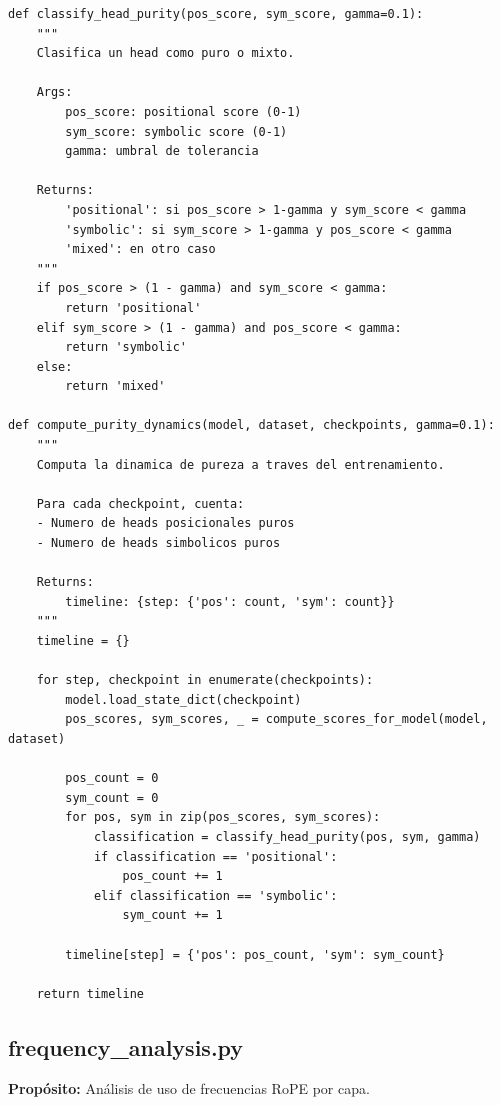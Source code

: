 \documentclass[12pt,a4paper]{report}
\begin{document}
\begin{lstlisting}
def classify_head_purity(pos_score, sym_score, gamma=0.1):
    """
    Clasifica un head como puro o mixto.
    
    Args:
        pos_score: positional score (0-1)
        sym_score: symbolic score (0-1)
        gamma: umbral de tolerancia
    
    Returns:
        'positional': si pos_score > 1-gamma y sym_score < gamma
        'symbolic': si sym_score > 1-gamma y pos_score < gamma
        'mixed': en otro caso
    """
    if pos_score > (1 - gamma) and sym_score < gamma:
        return 'positional'
    elif sym_score > (1 - gamma) and pos_score < gamma:
        return 'symbolic'
    else:
        return 'mixed'

def compute_purity_dynamics(model, dataset, checkpoints, gamma=0.1):
    """
    Computa la dinamica de pureza a traves del entrenamiento.
    
    Para cada checkpoint, cuenta:
    - Numero de heads posicionales puros
    - Numero de heads simbolicos puros
    
    Returns:
        timeline: {step: {'pos': count, 'sym': count}}
    """
    timeline = {}
    
    for step, checkpoint in enumerate(checkpoints):
        model.load_state_dict(checkpoint)
        pos_scores, sym_scores, _ = compute_scores_for_model(model, dataset)
        
        pos_count = 0
        sym_count = 0
        for pos, sym in zip(pos_scores, sym_scores):
            classification = classify_head_purity(pos, sym, gamma)
            if classification == 'positional':
                pos_count += 1
            elif classification == 'symbolic':
                sym_count += 1
        
        timeline[step] = {'pos': pos_count, 'sym': sym_count}
    
    return timeline
\end{lstlisting}

\subsection{frequency\_analysis.py}
\label{subsec:frequency_analysis}

\textbf{Propósito:} Análisis de uso de frecuencias RoPE por capa.
\end{document}
